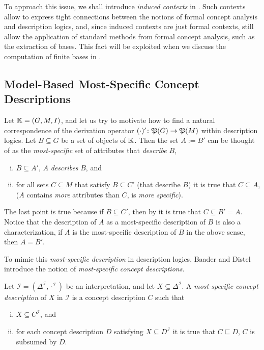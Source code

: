 To approach this issue, we shall introduce \emph{induced contexts} in
.  Such contexts allow to express tight connections between the
notions of formal concept analysis and description logics, and, since induced contexts are
just formal contexts, still allow the application of standard methods from formal concept
analysis, such as the extraction of bases.  This fact will be exploited when we discuss
the computation of finite bases in .

\subsection{Model-Based Most-Specific Concept Descriptions}
\label{sec:defin-and-basic}

Let ${\mathbb{K}} = (G, M, I)$, and let us try to motivate how to find a natural correspondence
of the derivation operator $(\cdot)' \colon {\ensuremath{\mathfrak{P}(G)}} \to {\ensuremath{\mathfrak{P}(M)}}$ within
description logics.  Let $B \subseteq G$ be a set of objects of ${\mathbb{K}}$.  Then the set $A
:= B'$ can be thought of as the \emph{most-specific} set of attributes that
\emph{describe} $B$, \ie
\begin{enumerate}[i. ]
\item $B \subseteq A'$, \ie $A$ \emph{describes} $B$, and
\item for all sets $C \subseteq M$ that satisfy $B \subseteq C'$ (that describe $B$) it is
  true that $C \subseteq A$, ($A$ contains \emph{more} attributes than $C$, \ie is
  \emph{more specific}).
\end{enumerate}
The last point is true because if $B \subseteq C'$, then by
 it is true that $C \subseteq B' = A$.  Notice
that the description of $A$ as a most-specific description of $B$ is also a
characterization, \ie if $A$ is the most-specific description of $B$ in the above sense,
then $A = B'$.

To mimic this \emph{most-specific description} in description logics, Baader and Distel
introduce the notion of \emph{most-specific concept descriptions}.

\begin{Definition}
  \label{def:most-specific-concept-description}
  Let $\mathcal{I} = (\Delta^{\mathcal{I}}, \cdot^{\mathcal{I}})$ be an interpretation, and
  let $X \subseteq \Delta^{\mathcal{I}}$.  A \emph{most-specific concept description} of
  $X$ in $\mathcal{I}$ is a concept description $C$ such that
  \begin{enumerate}[i. ]
  \item $X \subseteq C^{\mathcal{I}}$, and
  \item for each concept description $D$ satisfying $X \subseteq D^{\mathcal{I}}$ it is
    true that $C \sqsubseteq D$, \ie $C$ is subsumed by $D$.
  \end{enumerate}
\end{Definition}

